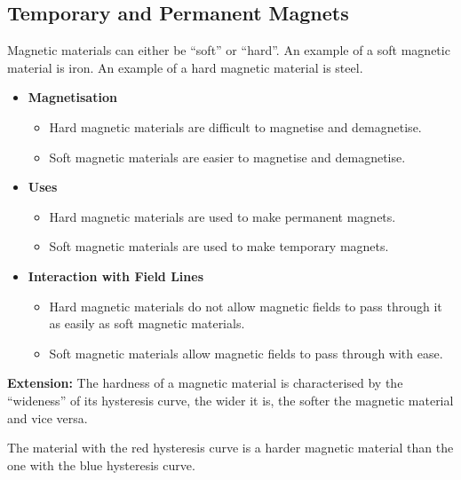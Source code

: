 \documentclass[../main.tex]{subfiles}
\begin{document}
	\subsection{Temporary and Permanent Magnets}
	Magnetic materials can either be ``soft'' or ``hard''. An example of a soft magnetic material is iron. An example of a hard magnetic material is steel.
	\begin{itemize}
		\item \textbf{Magnetisation} \begin{itemize}
			\item Hard magnetic materials are difficult to magnetise and demagnetise.
			\item Soft magnetic materials are easier to magnetise and demagnetise.
		\end{itemize}
		\item \textbf{Uses} \begin{itemize}
			\item Hard magnetic materials are used to make permanent magnets.
			\item Soft magnetic materials are used to make temporary magnets.
		\end{itemize}
		\item \textbf{Interaction with Field Lines} \begin{itemize}
			\item Hard magnetic materials do not allow magnetic fields to pass through it as easily as soft magnetic materials.
			\item Soft magnetic materials allow magnetic fields to pass through with ease.
		\end{itemize}
	\end{itemize}
	\textbf{Extension:} The hardness of a magnetic material is characterised by the ``wideness'' of its hysteresis curve, the wider it is, the softer the magnetic material and vice versa.
	\begin{figure}[H]
		\centering
	\end{figure}
	The material with the red hysteresis curve is a harder magnetic material than the one with the blue hysteresis curve.
\end{document}
